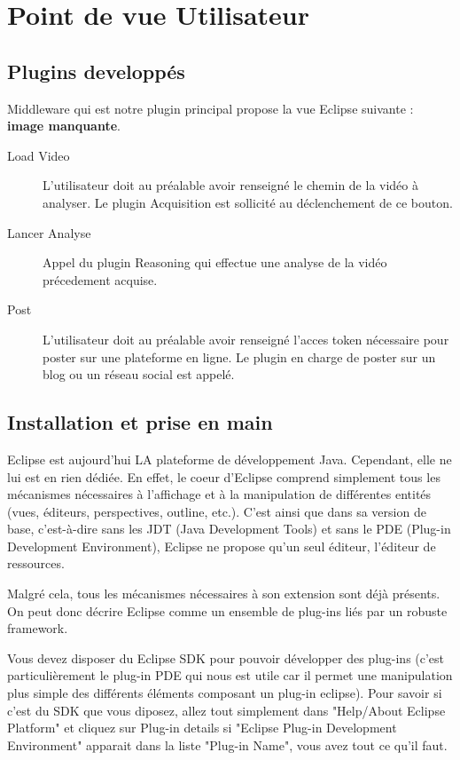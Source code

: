 \chapter{Point de vue Utilisateur}

\section{Plugins developpés}
Middleware qui est notre plugin principal propose la vue Eclipse suivante : \textbf{image manquante}. 
\begin{description}
\item[Load Video]
L'utilisateur doit au préalable avoir renseigné le chemin de la vidéo à analyser. Le plugin Acquisition est sollicité au déclenchement de ce bouton. 
\item[Lancer Analyse]
Appel du plugin Reasoning qui effectue une analyse de la vidéo précedement acquise.
\item[Post]
L'utilisateur doit au préalable avoir renseigné l'acces token nécessaire pour poster sur une plateforme en ligne. 
Le plugin en charge de poster sur un blog ou un réseau social est appelé.
\end{description}
 
\section{Installation et prise en main}

Eclipse est aujourd'hui LA plateforme de développement Java. Cependant, elle ne lui est en rien dédiée. En effet, le coeur d'Eclipse comprend simplement tous les mécanismes nécessaires à l'affichage et à la manipulation de différentes entités (vues, éditeurs, perspectives, outline, etc.). C'est ainsi que dans sa version de base, c'est-à-dire sans les JDT (Java Development Tools) et sans le PDE (Plug-in Development Environment), Eclipse ne propose qu'un seul éditeur, l'éditeur de ressources. 

 Malgré cela, tous les mécanismes nécessaires à son extension sont déjà présents. On peut donc décrire Eclipse comme un ensemble de plug-ins liés par un robuste framework. 

Vous devez disposer du Eclipse SDK pour pouvoir développer des plug-ins (c'est particulièrement le plug-in PDE qui nous est utile car il permet une manipulation plus simple des différents éléments composant un plug-in eclipse). Pour savoir si c'est du SDK que vous diposez, allez tout simplement dans "Help/About Eclipse Platform" et cliquez sur Plug-in details si "Eclipse Plug-in Development Environment" apparait dans la liste "Plug-in Name", vous avez tout ce qu'il faut.

